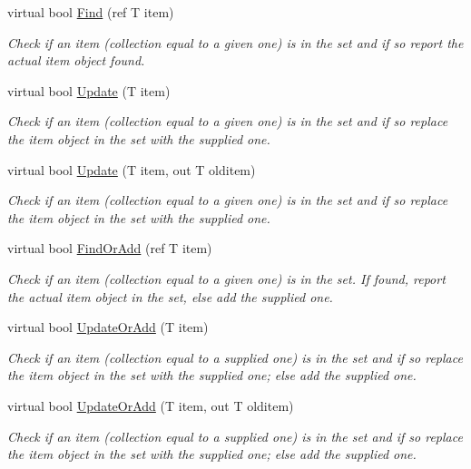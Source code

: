 \begin{DoxyCompactItemize}
virtual bool \hyperlink{class_c5_1_1_hash_set_a68b40c2f8c5483825915945d0f21278a}{Find} (ref T item)
\begin{DoxyCompactList}\small\item\em Check if an item (collection equal to a given one) is in the set and if so report the actual item object found. \end{DoxyCompactList}\item 
virtual bool \hyperlink{class_c5_1_1_hash_set_a0cfae793ab357695699f58064b892c8d}{Update} (T item)
\begin{DoxyCompactList}\small\item\em Check if an item (collection equal to a given one) is in the set and if so replace the item object in the set with the supplied one. \end{DoxyCompactList}\item 
virtual bool \hyperlink{class_c5_1_1_hash_set_aa0037ac87af2603ab0641e3037e5ee55}{Update} (T item, out T olditem)
\begin{DoxyCompactList}\small\item\em Check if an item (collection equal to a given one) is in the set and if so replace the item object in the set with the supplied one. \end{DoxyCompactList}\item 
virtual bool \hyperlink{class_c5_1_1_hash_set_a0b1d42cbbc91e630ab0917a2b17e8ca1}{Find\+Or\+Add} (ref T item)
\begin{DoxyCompactList}\small\item\em Check if an item (collection equal to a given one) is in the set. If found, report the actual item object in the set, else add the supplied one. \end{DoxyCompactList}\item 
virtual bool \hyperlink{class_c5_1_1_hash_set_a65709285f46c3bfd43d5dda1c4ab54fd}{Update\+Or\+Add} (T item)
\begin{DoxyCompactList}\small\item\em Check if an item (collection equal to a supplied one) is in the set and if so replace the item object in the set with the supplied one; else add the supplied one. \end{DoxyCompactList}\item 
virtual bool \hyperlink{class_c5_1_1_hash_set_a2a07fae0af3a3f329d47719019fb2c5b}{Update\+Or\+Add} (T item, out T olditem)
\begin{DoxyCompactList}\small\item\em Check if an item (collection equal to a supplied one) is in the set and if so replace the item object in the set with the supplied one; else add the supplied one. \end{DoxyCompactList}\item 

\end{DoxyCompactItemize}
